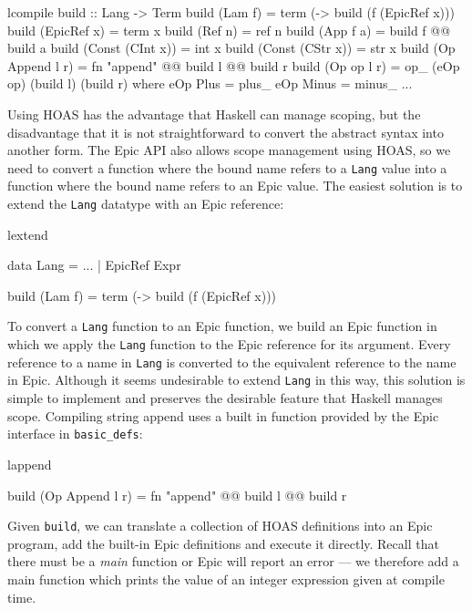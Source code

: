 \begin{SaveVerbatim}{lcompile}
build :: Lang -> Term
build (Lam f)          = term (\x -> build (f (EpicRef x)))
build (EpicRef x)      = term x
build (Ref n)          = ref n
build (App f a)        = build f @@ build a
build (Const (CInt x)) = int x
build (Const (CStr x)) = str x
build (Op Append l r)  = fn "append" @@ build l @@ build r
build (Op op l r)      = op_ (eOp op) (build l) (build r)
    where eOp Plus   = plus_
          eOp Minus  = minus_
          ...
\end{SaveVerbatim}

Using HOAS has the advantage that Haskell can
manage scoping, but the disadvantage that it is not straightforward to
convert the abstract syntax into another form. The Epic API also
allows scope management using HOAS, so we need to convert a function
where the bound name refers to a \texttt{Lang} value into a function
where the bound name refers to an Epic value. The easiest solution is
to extend the \texttt{Lang} datatype with an Epic reference:

\begin{SaveVerbatim}{lextend}

data Lang = ...
          | EpicRef Expr

build (Lam f) = term (\x -> build (f (EpicRef x)))

\end{SaveVerbatim}

\noindent
To convert a \texttt{Lang} function to an Epic function, we build an
Epic function in which we apply the \texttt{Lang} function to the Epic
reference for its argument. Every reference to a name in \texttt{Lang}
is converted to the equivalent reference to the name in Epic. 
Although it seems undesirable to extend \texttt{Lang} in this way, this
solution is simple to implement and preserves the
desirable feature that Haskell manages scope.
Compiling string append uses a built in function provided by the Epic
interface in \texttt{basic\_defs}:

\begin{SaveVerbatim}{lappend}

build (Op Append l r) = fn "append" @@ build l @@ build r

\end{SaveVerbatim}

\noindent
Given \texttt{build}, we can translate a collection of HOAS
definitions into an Epic program, add the built-in Epic definitions
and execute it directly. Recall that there must be a 
\textit{main} function or Epic will report an error --- we therefore add a
main function which prints the value of an integer expression
given at compile time.

